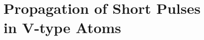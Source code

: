\chapter[Propagation of Short Pulses in V-type Atoms]
  {Propagation of Short Pulses\\ in V-type Atoms}
  \label{chp:simultons}